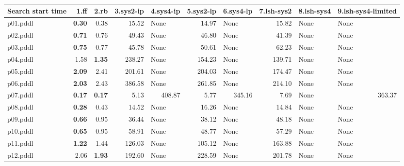 \documentclass{article}
\begin{document}
\begin{tabular}{@{}lrrrrrrrrr@{}}
Search start time & 1.ff & 2.rb & 3.sys2-ip & 4.sys4-ip & 5.sys2-lp & 6.sys4-lp & 7.lsh-sys2 & 8.lsh-sys4 & 9.lsh-sys4-limited \\
\midrule
p01.pddl & \textbf{0.30} & 0.38 & 15.52 & \multicolumn{1}{|l|}{None} & 14.97 & \multicolumn{1}{|l|}{None} & 15.82 & \multicolumn{1}{|l|}{None} & \multicolumn{1}{|l|}{None} \\
p02.pddl & \textbf{0.71} & 0.76 & 49.43 & \multicolumn{1}{|l|}{None} & 46.80 & \multicolumn{1}{|l|}{None} & 41.39 & \multicolumn{1}{|l|}{None} & \multicolumn{1}{|l|}{None} \\
p03.pddl & \textbf{0.75} & 0.77 & 45.78 & \multicolumn{1}{|l|}{None} & 50.61 & \multicolumn{1}{|l|}{None} & 62.23 & \multicolumn{1}{|l|}{None} & \multicolumn{1}{|l|}{None} \\
p04.pddl & 1.58 & \textbf{1.35} & 238.27 & \multicolumn{1}{|l|}{None} & 154.23 & \multicolumn{1}{|l|}{None} & 139.71 & \multicolumn{1}{|l|}{None} & \multicolumn{1}{|l|}{None} \\
p05.pddl & \textbf{2.09} & 2.41 & 201.61 & \multicolumn{1}{|l|}{None} & 204.03 & \multicolumn{1}{|l|}{None} & 174.47 & \multicolumn{1}{|l|}{None} & \multicolumn{1}{|l|}{None} \\
p06.pddl & \textbf{2.03} & 2.43 & 386.58 & \multicolumn{1}{|l|}{None} & 261.85 & \multicolumn{1}{|l|}{None} & 214.10 & \multicolumn{1}{|l|}{None} & \multicolumn{1}{|l|}{None} \\
p07.pddl & \textbf{0.17} & \textbf{0.17} & 5.13 & 408.87 & 5.77 & 345.16 & 7.69 & \multicolumn{1}{|l|}{None} & 363.37 \\
p08.pddl & \textbf{0.28} & 0.43 & 14.52 & \multicolumn{1}{|l|}{None} & 16.26 & \multicolumn{1}{|l|}{None} & 14.84 & \multicolumn{1}{|l|}{None} & \multicolumn{1}{|l|}{None} \\
p09.pddl & \textbf{0.66} & 0.95 & 36.44 & \multicolumn{1}{|l|}{None} & 38.12 & \multicolumn{1}{|l|}{None} & 48.18 & \multicolumn{1}{|l|}{None} & \multicolumn{1}{|l|}{None} \\
p10.pddl & \textbf{0.65} & 0.95 & 58.91 & \multicolumn{1}{|l|}{None} & 48.77 & \multicolumn{1}{|l|}{None} & 57.29 & \multicolumn{1}{|l|}{None} & \multicolumn{1}{|l|}{None} \\
p11.pddl & \textbf{1.22} & 1.44 & 126.03 & \multicolumn{1}{|l|}{None} & 105.12 & \multicolumn{1}{|l|}{None} & 163.88 & \multicolumn{1}{|l|}{None} & \multicolumn{1}{|l|}{None} \\
p12.pddl & 2.06 & \textbf{1.93} & 192.60 & \multicolumn{1}{|l|}{None} & 228.59 & \multicolumn{1}{|l|}{None} & 201.78 & \multicolumn{1}{|l|}{None} & \multicolumn{1}{|l|}{None} \\

\end{tabular}
\end{document}
